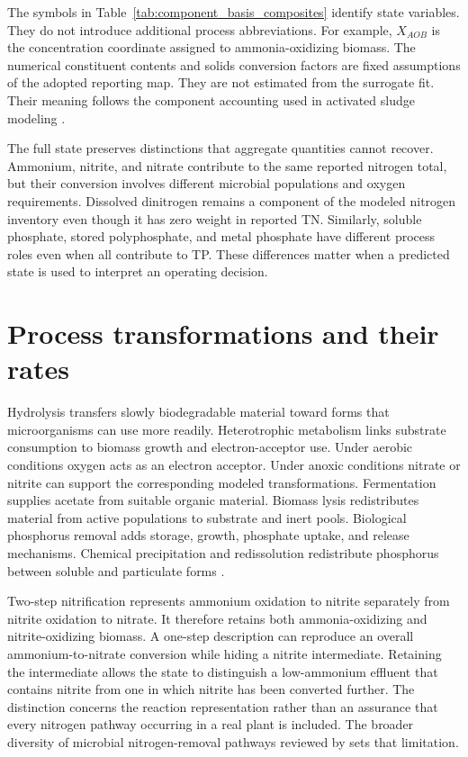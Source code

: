The symbols in Table~\ref{tab:component_basis_composites} identify state variables. They do not introduce additional process abbreviations. For example, $X_{AOB}$ is the concentration coordinate assigned to ammonia-oxidizing biomass. The numerical constituent contents and solids conversion factors are fixed assumptions of the adopted reporting map. They are not estimated from the surrogate fit. Their meaning follows the component accounting used in activated sludge modeling \citep{Henze2006}.

The full state preserves distinctions that aggregate quantities cannot recover. Ammonium, nitrite, and nitrate contribute to the same reported nitrogen total, but their conversion involves different microbial populations and oxygen requirements. Dissolved dinitrogen remains a component of the modeled nitrogen inventory even though it has zero weight in reported TN. Similarly, soluble phosphate, stored polyphosphate, and metal phosphate have different process roles even when all contribute to TP. These differences matter when a predicted state is used to interpret an operating decision.

\section{Process transformations and their rates}

Hydrolysis transfers slowly biodegradable material toward forms that microorganisms can use more readily. Heterotrophic metabolism links substrate consumption to biomass growth and electron-acceptor use. Under aerobic conditions oxygen acts as an electron acceptor. Under anoxic conditions nitrate or nitrite can support the corresponding modeled transformations. Fermentation supplies acetate from suitable organic material. Biomass lysis redistributes material from active populations to substrate and inert pools. Biological phosphorus removal adds storage, growth, phosphate uptake, and release mechanisms. Chemical precipitation and redissolution redistribute phosphorus between soluble and particulate forms \citep{Henze2006,Guerrero2011}.

Two-step nitrification represents ammonium oxidation to nitrite separately from nitrite oxidation to nitrate. It therefore retains both ammonia-oxidizing and nitrite-oxidizing biomass. A one-step description can reproduce an overall ammonium-to-nitrate conversion while hiding a nitrite intermediate. Retaining the intermediate allows the state to distinguish a low-ammonium effluent that contains nitrite from one in which nitrite has been converted further. The distinction concerns the reaction representation rather than an assurance that every nitrogen pathway occurring in a real plant is included. The broader diversity of microbial nitrogen-removal pathways reviewed by \citet{Duan2022} sets that limitation.

